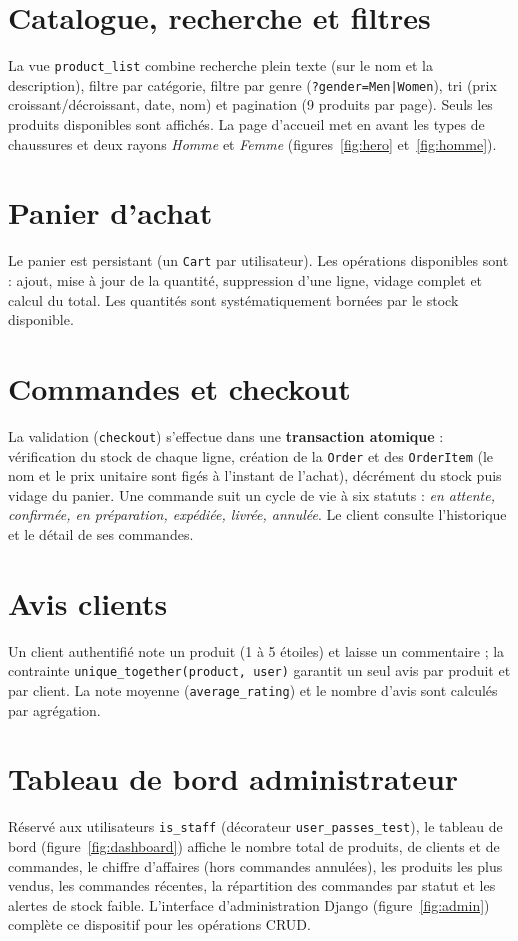 \documentclass[11pt,a4paper]{report}
\begin{document}
\section{Catalogue, recherche et filtres}
La vue \texttt{product\_list} combine recherche plein texte (sur le nom et la
description), filtre par catégorie, filtre par genre (\texttt{?gender=Men|Women}),
tri (prix croissant/dé\-croissant, date, nom) et pagination (9 produits par page).
Seuls les produits disponibles sont affichés. La page d'accueil met en avant les
types de chaussures et deux rayons \emph{Homme} et \emph{Femme}
(figures~\ref{fig:hero} et~\ref{fig:homme}).

\section{Panier d'achat}
Le panier est persistant (un \texttt{Cart} par utilisateur). Les opérations
disponibles sont : ajout, mise à jour de la quantité, suppression d'une ligne,
vidage complet et calcul du total. Les quantités sont systématiquement bornées par
le stock disponible.

\section{Commandes et checkout}
La validation (\texttt{checkout}) s'effectue dans une \textbf{transaction
atomique} : vérification du stock de chaque ligne, création de la \texttt{Order} et
des \texttt{OrderItem} (le nom et le prix unitaire sont figés à l'instant de
l'achat), décrément du stock puis vidage du panier. Une commande suit un cycle de
vie à six statuts : \emph{en attente, confirmée, en préparation, expédiée, livrée,
annulée}. Le client consulte l'historique et le détail de ses commandes.

\section{Avis clients}
Un client authentifié note un produit (1 à 5 étoiles) et laisse un commentaire ; la
contrainte \texttt{unique\_together(product, user)} garantit un seul avis par
produit et par client. La note moyenne (\texttt{average\_rating}) et le nombre
d'avis sont calculés par agrégation.

\section{Tableau de bord administrateur}
Réservé aux utilisateurs \texttt{is\_staff} (décorateur
\texttt{user\_passes\_test}), le tableau de bord (figure~\ref{fig:dashboard})
affiche le nombre total de produits, de clients et de commandes, le chiffre
d'affaires (hors commandes annulées), les produits les plus vendus, les commandes
récentes, la répartition des commandes par statut et les alertes de stock faible.
L'interface d'administration Django (figure~\ref{fig:admin}) complète ce dispositif
pour les opérations CRUD.
\end{document}
